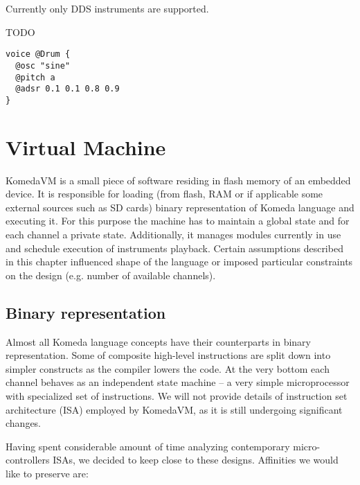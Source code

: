 \documentclass{article}
\begin{document}
Currently only DDS\cite{DDS} instruments are supported. 

TODO

\begin{lstlisting}[caption=Example voice definition]
voice @Drum {
  @osc "sine"
  @pitch a
  @adsr 0.1 0.1 0.8 0.9
}
\end{lstlisting}

\section{Virtual Machine}

KomedaVM is a small piece of software residing in flash memory of an embedded
device. It is responsible for loading (from flash, RAM or if applicable some
external sources such as SD cards) binary representation of Komeda language and
executing it.  For this purpose the machine has to maintain a global state and
for each channel a private state. Additionally, it manages modules currently in
use and schedule execution of instruments playback. Certain assumptions
described in this chapter influenced shape of the language or imposed
particular constraints on the design (e.g. number of available channels).  

\subsection{Binary representation}

Almost all Komeda language concepts have their counterparts in binary
representation.  Some of composite high-level instructions are split down into
simpler constructs as the compiler lowers the code.  At the very bottom each
channel behaves as an independent state machine -- a very simple microprocessor
with specialized set of instructions.  We will not provide details of
instruction set architecture (ISA) employed by KomedaVM, as it is still
undergoing significant changes.

Having spent considerable amount of time analyzing contemporary
micro-controllers ISAs, we decided to keep close to these designs. Affinities
we would like to preserve are:
\end{document}
